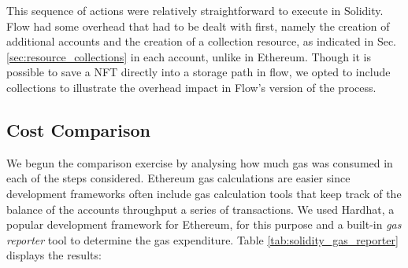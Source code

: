 \documentclass[../NFTComp_IEEE.tex]{subfiles}
\begin{document}
This sequence of actions were relatively straightforward to execute in Solidity. Flow had some overhead that had to be dealt with first, namely the creation of additional accounts and the creation of a collection resource, as indicated in Sec. \ref{sec:resource_collections} in each account, unlike in Ethereum. Though it is possible to save a NFT directly into a storage path in flow, we opted to include collections to illustrate the overhead impact in Flow's version of the process.

\subsection{Cost Comparison}
\label{sec:cost_comparison}
We begun the comparison exercise by analysing how much gas was consumed in each of the steps considered. Ethereum gas calculations are easier since development frameworks often include gas calculation tools that keep track of the balance of the accounts throughput a series of transactions. We used Hardhat, a popular development framework for Ethereum, for this purpose and a built-in \textit{gas reporter} tool to determine the gas expenditure. Table \ref{tab:solidity_gas_reporter} displays the results:
\end{document}
